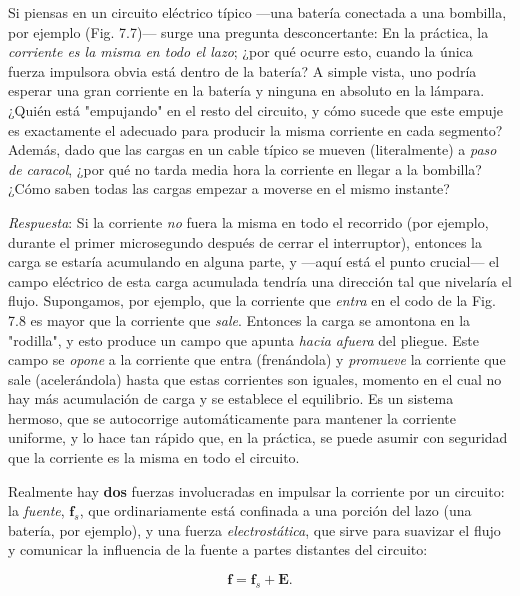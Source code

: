 \documentclass[12pt,a4paper]{report}
\newcommand{\esp}{\vspace{0.5cm}}
\begin{document}
	Si piensas en un circuito eléctrico típico —una batería conectada a una bombilla, por ejemplo (Fig. 7.7)— surge una pregunta desconcertante: En la práctica, la \textit{corriente es la misma en todo el lazo}; ¿por qué ocurre esto, cuando la única fuerza impulsora obvia está dentro de la batería? A simple vista, uno podría esperar una gran corriente en la batería y ninguna en absoluto en la lámpara. ¿Quién está "empujando" en el resto del circuito, y cómo sucede que este empuje es exactamente el adecuado para producir la misma corriente en cada segmento? Además, dado que las cargas en un cable típico se mueven (literalmente) a \textit{paso de caracol}, ¿por qué no tarda media hora la corriente en llegar a la bombilla? ¿Cómo saben todas las cargas empezar a moverse en el mismo instante?
	
	\esp
	
	\textit{Respuesta}: Si la corriente \textit{no} fuera la misma en todo el recorrido (por ejemplo, durante el primer microsegundo después de cerrar el interruptor), entonces la carga se estaría acumulando en alguna parte, y —aquí está el punto crucial— el campo eléctrico de esta carga acumulada tendría una dirección tal que nivelaría el flujo. Supongamos, por ejemplo, que la corriente que \textit{entra} en el codo de la Fig. 7.8 es mayor que la corriente que \textit{sale}. Entonces la carga se amontona en la "rodilla", y esto produce un campo que apunta \textit{hacia afuera} del pliegue. Este campo se \textit{opone} a la corriente que entra (frenándola) y \textit{promueve} la corriente que sale (acelerándola) hasta que estas corrientes son iguales, momento en el cual no hay más acumulación de carga y se establece el equilibrio. Es un sistema hermoso, que se autocorrige automáticamente para mantener la corriente uniforme, y lo hace tan rápido que, en la práctica, se puede asumir con seguridad que la corriente es la misma en todo el circuito.
	
	\esp
	
	Realmente hay \textbf{dos} fuerzas involucradas en impulsar la corriente por un circuito: la \textit{fuente}, $\mathbf{f}_s$, que ordinariamente está confinada a una porción del lazo (una batería, por ejemplo), y una fuerza \textit{electrostática}, que sirve para suavizar el flujo y comunicar la influencia de la fuente a partes distantes del circuito:
	
	\esp
	
	\begin{equation}
		\mathbf{f} = \mathbf{f}_s + \mathbf{E}. \tag{7.8}
	\end{equation}
	
\end{document}
